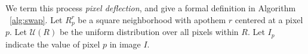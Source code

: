 
We term this process \textit{pixel deflection}, and give a formal definition in Algorithm ~\ref{alg:swap}.
Let $R^r_{p}$ be a square neighborhood with apothem $r$ centered at a pixel $p$.
Let $\mathcal{U}(R)$ be the uniform distribution over all pixels within $R$.
Let $I_p$ indicate the value of pixel $p$ in image $I$.





